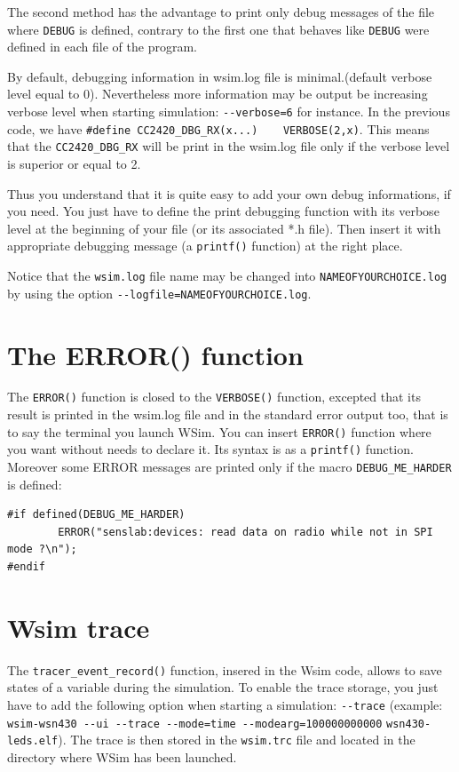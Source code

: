 \documentclass[a4paper,10pt]{report}
\begin{document}
The second method has the advantage to print only debug messages of the file where \verb$DEBUG$ is defined, contrary to the first one that behaves like \verb$DEBUG$ were defined in each file of the program.

By default, debugging information in wsim.log file is minimal.(default verbose level equal to 0). Nevertheless more information may be output be increasing verbose level when starting simulation: \verb$--verbose=6$ for instance.
In the previous code, we have \verb$#define CC2420_DBG_RX(x...)    VERBOSE(2,x)$. This means that the \verb$CC2420_DBG_RX$ will be print in the wsim.log file only if the verbose level is superior or equal to 2.

Thus you understand that it is quite easy to add your own debug informations, if you need. You just have to define the print debugging function with its verbose level at the beginning of your file (or its associated *.h file). Then insert it with appropriate debugging message (a \verb$printf()$ function) at the right place.

Notice that the \verb$wsim.log$ file name may be changed into \verb$NAMEOFYOURCHOICE.log$ by using the option \verb$--logfile=NAMEOFYOURCHOICE.log$.

\section{The ERROR() function}
The \verb$ERROR()$ function is closed to the \verb$VERBOSE()$ function, excepted that its result is printed in the wsim.log file and in the standard error output too, that is to say the terminal you launch WSim.
You can insert \verb$ERROR()$ function where you want without needs to declare it. Its syntax is as a \verb$printf()$ function.
Moreover some ERROR messages are printed only if the macro \verb$DEBUG_ME_HARDER$ is defined:
\begin{verbatim}
#if defined(DEBUG_ME_HARDER)
	    ERROR("senslab:devices: read data on radio while not in SPI mode ?\n");
#endif
\end{verbatim}

\section{Wsim trace}
The \verb$tracer_event_record()$ function, insered in the Wsim code, allows to save states of a variable during the simulation. To enable the trace storage, you just have to add the following option when starting a simulation: \verb$--trace$ (example: \verb$wsim-wsn430 --ui --trace --mode=time --modearg=100000000000$ \verb$wsn430-leds.elf$). The trace is then stored in the \verb$wsim.trc$ file and located in the  directory where WSim has been launched.
\end{document}
